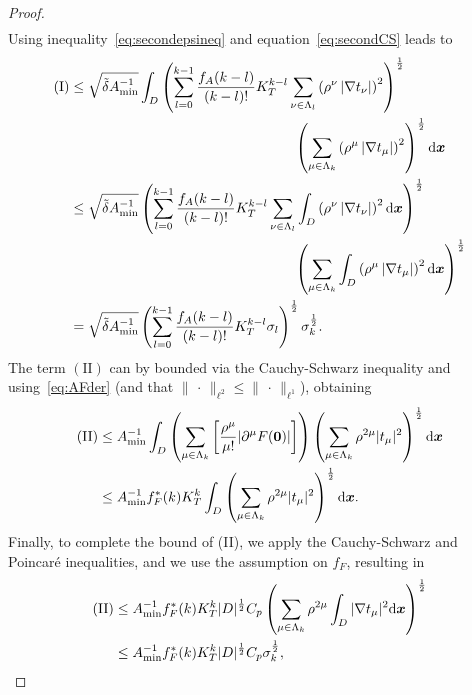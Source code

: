 \begin{proof}
\begin{align}
	\end{align}
	Using inequality~\eqref{eq:secondepsineq} and equation~\eqref{eq:secondCS} leads to
	\begin{align}
	(\text{I})  &\leq \sqrt{{\tilde{\delta}}  A_{\min}^{-1}} \int_{{D}} \left(\sum_{l=0}^{k-1}\frac{f_A(k-l)}{(k-l)!}K_T^{k-l} \sum_{\nu \in \Lambda_l}   \left(\rho^\nu\left|\nabla  t_\nu\right|\right)^2\right)^{\frac{1}{2}} \\&\qquad\qquad\qquad\qquad\qquad\qquad\qquad\qquad \left(\sum_{\mu \in \Lambda_k}\left( \rho^\mu \left|\nabla t_\mu\right|\right)^2\right)^{\frac{1}{2 }} \mathrm{d}{{\bm{x}}} \nonumber\\
	&\leq \sqrt{{\tilde{\delta}}  A_{\min}^{-1}} \left(\sum_{l=0}^{k-1}\frac{f_A(k-l)}{(k-l)!}K_T^{k-l} \sum_{\nu \in \Lambda_l} \int_{{D}} \left( \rho^\nu\left|\nabla  t_\nu\right|\right)^2\mathrm{d}{{\bm{x}}} \right)^{\frac{1}{2 }}\\&\qquad\qquad\qquad\qquad\qquad\qquad\qquad\qquad \left(  \sum_{\mu \in \Lambda_k}\int_{{D}} \left( \rho^\mu \left|\nabla t_\mu\right|\right)^2\mathrm{d}{{\bm{x}}}\right)^{\frac{1}{2}} \nonumber\\
	&=  \sqrt{{\tilde{\delta}}  A_{\min}^{-1}} \left(\sum_{l=0}^{k-1}\frac{f_A(k-l)}{(k-l)!}K_T^{k-l} \sigma_l \right)^{\frac{1}{2 }}  \sigma_k^{\frac{1}{2}}.\label{eq:Ibound}
	\end{align}
	The term $(\text{II})$ can by bounded via the Cauchy-Schwarz inequality and using~\eqref{eq:AFder} (and that $\lVert\,\cdot\,\rVert_{\ell^2}\leq\lVert\,\cdot\,\rVert_{\ell^1}$), obtaining
	\begin{align}
	(\text{II})
		& \leq A_{\min}^{-1}\int_{{D}} \left(\sum_{\mu \in \Lambda_k} \left[ \frac{\rho^{\mu}}{\mu!} |\partial^\mu {F}(\bm{0})|\right]\right)\left(\sum_{\mu \in \Lambda_k}\rho^{2\mu}|t_\mu|^2 \right)^{\frac{1}{2}} \mathrm{d}{{\bm{x}}}\nonumber\\
		&\leq   A_{\min}^{-1}f^*_F(k) K_T ^k  \int_{{D}}    \left(\sum_{\mu \in \Lambda_k}\rho^{2\mu}|t_\mu|^2 \right)^{\frac{1}{2}} \mathrm{d}{{\bm{x}}}.  \nonumber
	\end{align}
	Finally, to complete the bound of (II), we apply the Cauchy-Schwarz and Poincar\'e inequalities, and we use the assumption on $f_F$, resulting in
	\begin{align}
	(\text{II}) &\leq  A_{\min}^{-1}f^*_F(k) K_T^k |D|^{\frac{1}{2}} C_p  \left(\sum_{\mu \in \Lambda_k}\rho^{2\mu}\int_{{D}}|\nabla t_\mu|^2 \mathrm{d}{{\bm{x}}} \right)^{\frac{1}{2}}\\
	&\leq A_{\min}^{-1} f^*_F(k) K_T^k   |D|^{\frac{1}{2}}   C_p   \sigma_k^{\frac{1}{2}},  \label{eq:IIbound}
	\end{align}

\end{proof}
